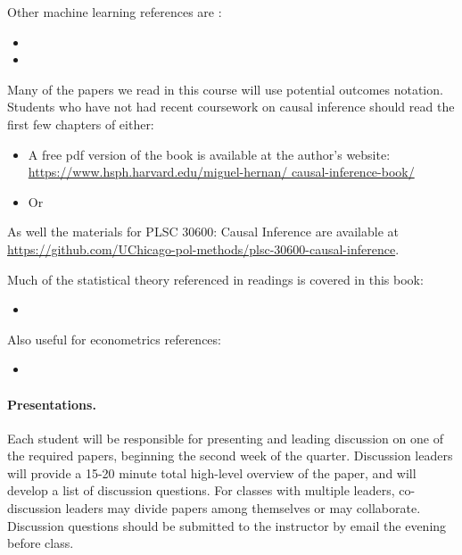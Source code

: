 \documentclass[letterpaper, 12pt, parskip=full,DIV=10]{scrartcl}
\begin{document}
Other machine learning references are :
\begin{itemize}
\item {}
\item {}
\end{itemize}

Many of the papers we read in this course will use potential outcomes notation. Students who have not had recent coursework on causal inference should read the first few chapters of either:
\begin{itemize}
\item
{}

A free pdf version of the book is available at the author's website: \url{https://www.hsph.harvard.edu/miguel-hernan/
causal-inference-book/}
\item 
Or\\
\end{itemize}

As well the materials for PLSC 30600: Causal Inference are available at \url{https://github.com/UChicago-pol-methods/plsc-30600-causal-inference}. 

Much of the statistical theory referenced in readings is covered in this book: 
\begin{itemize}
\item {}
\end{itemize}

Also useful for econometrics references:
\begin{itemize}
\item {}
\end{itemize}



\paragraph{Presentations.}
Each student will be responsible for presenting and leading discussion on one of the required papers, beginning the second week of the quarter. Discussion leaders will provide a 15-20 minute total high-level overview of the paper, and will develop a list of discussion questions. For classes with multiple leaders, co-discussion leaders may divide papers among themselves or may collaborate. Discussion questions should be submitted to the instructor by email the evening before class. 
\end{document}
